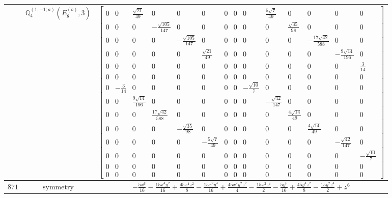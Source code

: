 \documentclass[fleqn,8pt,landscape]{jsarticle}
\begin{document}
\begin{longtable}{ccc}
$  $ & $ \mathbb{Q}_{4}^{(1,-1;a)}(E_{g}^{(b)},3) $ & $ \begin{bmatrix} 0 & 0 & \frac{\sqrt{21}}{49} & 0 & 0 & 0 & 0 & 0 & 0 & \frac{5 \sqrt{7}}{49} & 0 & 0 & 0 & 0 \\ 0 & 0 & 0 & - \frac{\sqrt{105}}{147} & 0 & 0 & 0 & 0 & 0 & 0 & \frac{\sqrt{35}}{98} & 0 & 0 & 0 \\ 0 & 0 & 0 & 0 & - \frac{\sqrt{105}}{147} & 0 & 0 & 0 & 0 & 0 & 0 & - \frac{17 \sqrt{42}}{588} & 0 & 0 \\ 0 & 0 & 0 & 0 & 0 & \frac{\sqrt{21}}{49} & 0 & 0 & 0 & 0 & 0 & 0 & - \frac{9 \sqrt{14}}{196} & 0 \\ 0 & 0 & 0 & 0 & 0 & 0 & 0 & 0 & 0 & 0 & 0 & 0 & 0 & \frac{3}{14} \\ 0 & 0 & 0 & 0 & 0 & 0 & 0 & 0 & 0 & 0 & 0 & 0 & 0 & 0 \\ 0 & - \frac{3}{14} & 0 & 0 & 0 & 0 & 0 & 0 & - \frac{\sqrt{10}}{7} & 0 & 0 & 0 & 0 & 0 \\ 0 & 0 & \frac{9 \sqrt{14}}{196} & 0 & 0 & 0 & 0 & 0 & 0 & - \frac{\sqrt{42}}{147} & 0 & 0 & 0 & 0 \\ 0 & 0 & 0 & \frac{17 \sqrt{42}}{588} & 0 & 0 & 0 & 0 & 0 & 0 & \frac{4 \sqrt{14}}{49} & 0 & 0 & 0 \\ 0 & 0 & 0 & 0 & - \frac{\sqrt{35}}{98} & 0 & 0 & 0 & 0 & 0 & 0 & \frac{4 \sqrt{14}}{49} & 0 & 0 \\ 0 & 0 & 0 & 0 & 0 & - \frac{5 \sqrt{7}}{49} & 0 & 0 & 0 & 0 & 0 & 0 & - \frac{\sqrt{42}}{147} & 0 \\ 0 & 0 & 0 & 0 & 0 & 0 & 0 & 0 & 0 & 0 & 0 & 0 & 0 & - \frac{\sqrt{10}}{7} \\ 0 & 0 & 0 & 0 & 0 & 0 & 0 & 0 & 0 & 0 & 0 & 0 & 0 & 0 \\ 0 & 0 & 0 & 0 & 0 & 0 & 0 & 0 & 0 & 0 & 0 & 0 & 0 & 0 \end{bmatrix} $ \\ \hline
$ 871 $ & $ \text{symmetry} $ & $ - \frac{5 x^{6}}{16} - \frac{15 x^{4} y^{2}}{16} + \frac{45 x^{4} z^{2}}{8} - \frac{15 x^{2} y^{4}}{16} + \frac{45 x^{2} y^{2} z^{2}}{4} - \frac{15 x^{2} z^{4}}{2} - \frac{5 y^{6}}{16} + \frac{45 y^{4} z^{2}}{8} - \frac{15 y^{2} z^{4}}{2} + z^{6} $ \\

\end{longtable}
\end{document}
